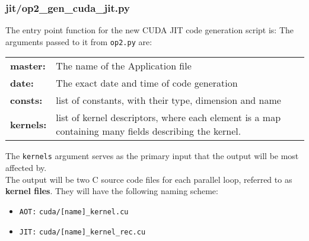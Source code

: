 \subsubsection{jit/op2\_gen\_cuda\_jit.py}
The entry point function for the new CUDA JIT code generation script is:
\noindent The arguments passed to it from \verb|op2.py| are:
\begin{center}
\begin{tabular}{>{\bfseries}l l}
master: & The name of the Application file \\[\medskipamount]
date: & The exact date and time of code generation \\[\medskipamount]
consts: & list of constants, with their type, dimension and name \\[\medskipamount]
kernels: & \parbox[t]{.8\textwidth}{list of kernel descriptors, where each element is a map containing many fields describing the kernel.} \\[\medskipamount]
\end{tabular}
\end{center}
\vspace{1em}
\noindent The \verb|kernels| argument serves as the primary input that the output will be most affected by. \\
The output will be two C source code files for each parallel loop, referred to as \textbf{kernel files}. They will have the following naming scheme:
\begin{itemize}
\vspace{-.5em}
\item{\texttt{AOT:} \verb|cuda/[name]_kernel.cu|}
\vspace{-.5em}
\item{\texttt{JIT:} \verb|cuda/[name]_kernel_rec.cu|}
\end{itemize}


